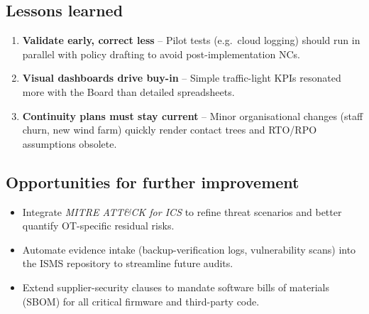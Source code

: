 \subsection{Lessons learned}

\begin{enumerate}
  \item \textbf{Validate early, correct less} – Pilot tests (e.g.\ cloud
        logging) should run in parallel with policy drafting to avoid
        post-implementation NCs.
  \item \textbf{Visual dashboards drive buy-in} – Simple traffic-light
        KPIs resonated more with the Board than detailed spreadsheets.
  \item \textbf{Continuity plans must stay current} – Minor organisational
        changes (staff churn, new wind farm) quickly render contact trees
        and \ac{RTO}/\ac{RPO} assumptions obsolete.
\end{enumerate}

\subsection{Opportunities for further improvement}

\begin{itemize}
  \item Integrate \emph{MITRE ATT\&CK for ICS} to refine threat scenarios
        and better quantify OT-specific residual risks.
  \item Automate evidence intake (backup-verification logs, vulnerability
        scans) into the \ac{ISMS} repository to streamline future audits.
  \item Extend supplier-security clauses to mandate software bills of
        materials (SBOM) for all critical firmware and third-party code.
\end{itemize}
